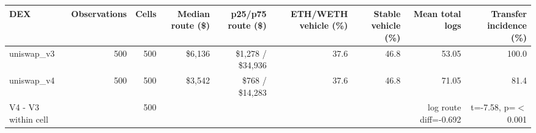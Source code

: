 \begin{tabular}{lrrrrrrrr}
\toprule
DEX & Observations & Cells & Median route (\$) & p25/p75 route (\$) & ETH/WETH vehicle (\%) & Stable vehicle (\%) & Mean total logs & Transfer incidence (\%) \\
\midrule
uniswap\_v3 & 500 & 500 & \$6,136 & \$1,278 / \$34,936 & 37.6 & 46.8 & 53.05 & 100.0 \\
uniswap\_v4 & 500 & 500 & \$3,542 & \$768 / \$14,283 & 37.6 & 46.8 & 71.05 & 81.4 \\
V4 - V3 within cell &  & 500 &  &  &  &  & log route diff=-0.692 & t=-7.58, p=\ensuremath{<}0.001 \\
\bottomrule
\end{tabular}
